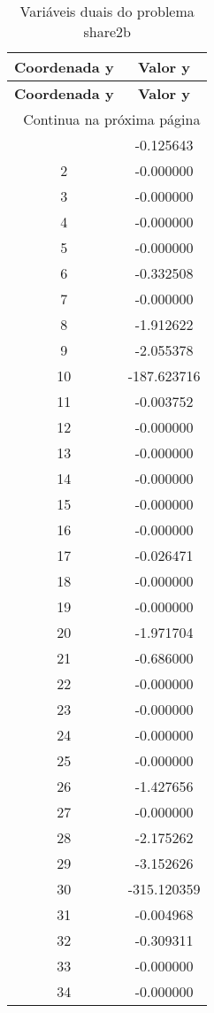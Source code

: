 \documentclass[12pt]{article}
\begin{document}
\begin{longtable}{@{}cc@{}}
\caption{Variáveis duais do problema share2b} \\
\toprule
\textbf{Coordenada y} & \textbf{Valor y} \\
\midrule
\endfirsthead

\toprule
\textbf{Coordenada y} & \textbf{Valor y} \\
\midrule
\endhead

\midrule \multicolumn{2}{r}{{Continua na próxima página}} \\ \midrule
\endfoot

\bottomrule
\endlastfoot
1 & -0.125643 \\
2 & -0.000000 \\
3 & -0.000000 \\
4 & -0.000000 \\
5 & -0.000000 \\
6 & -0.332508 \\
7 & -0.000000 \\
8 & -1.912622 \\
9 & -2.055378 \\
10 & -187.623716 \\
11 & -0.003752 \\
12 & -0.000000 \\
13 & -0.000000 \\
14 & -0.000000 \\
15 & -0.000000 \\
16 & -0.000000 \\
17 & -0.026471 \\
18 & -0.000000 \\
19 & -0.000000 \\
20 & -1.971704 \\
21 & -0.686000 \\
22 & -0.000000 \\
23 & -0.000000 \\
24 & -0.000000 \\
25 & -0.000000 \\
26 & -1.427656 \\
27 & -0.000000 \\
28 & -2.175262 \\
29 & -3.152626 \\
30 & -315.120359 \\
31 & -0.004968 \\
32 & -0.309311 \\
33 & -0.000000 \\
34 & -0.000000 \\

\end{longtable}
\end{document}
